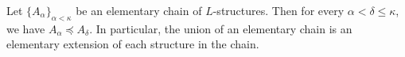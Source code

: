 Let $\{A_\alpha\}_{\alpha < \kappa}$ be an elementary chain of $L$-structures. Then for every $\alpha < \delta \leq \kappa$, we have $A_\alpha \preceq A_\delta$. In particular, the union of an elementary chain is an elementary extension of each structure in the chain.
